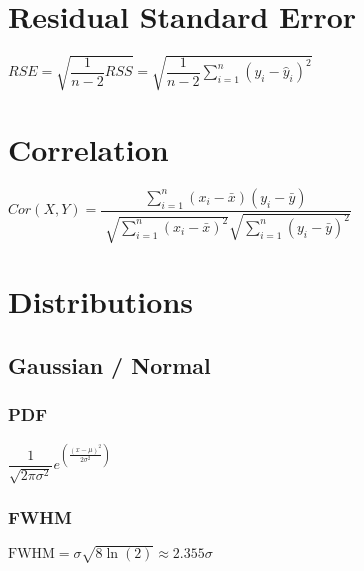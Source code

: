 \section{Residual Standard Error}
\begin{itemize}
\itemt \( RSE = \sqrt{\dfrac{1}{n-2}RSS} =\sqrt{\dfrac{1}{n-2}\sum\limits_{i=1}^n (y_i - \hat{y}_i)^2} \)
\end{itemize}



\section{Correlation}
\begin{itemize}
\itemt \( {Cor}(X,Y) = \dfrac{\sum\limits_{i=1}^n (x_i - \bar{x})(y_i - \bar{y})}{\sqrt[]{\sum\limits_{i=1}^n (x_i - \bar{x})^2}\sqrt{\sum\limits_{i=1}^n (y_i - \bar{y})^2}} \)
\end{itemize}



\section{Distributions}
\subsection{Gaussian / Normal}
\subsubsection{PDF}
\begin{itemize}
    \itemt \( \dfrac{1}{\sqrt{2\pi\sigma^2}} e^{\left(\frac{(x-\mu)^2}{2\sigma^2}\right)} \)
\end{itemize}
\subsubsection{FWHM}
\begin{itemize}
    \itemt \( \mathrm{FWHM} = \sigma \sqrt{8 \ln(2)} \approx 2.355 \sigma\)
\end{itemize}



